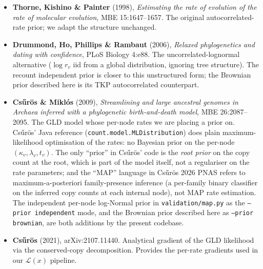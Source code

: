 \documentclass[11pt]{article}
\newcommand{\rate}{\kappa}             %
\newcommand{\dup}{\lambda}             %
\newcommand{\edgelen}{t}               %
\newcommand{\Ll}{\mathcal{L}}          %
\theoremstyle{definition}
\begin{document}
\begin{itemize}
\item \textbf{Thorne, Kishino \& Painter} (1998),
  \emph{Estimating the rate of evolution of the rate of molecular
  evolution}, MBE 15:1647--1657. The original autocorrelated-rate
  prior; we adapt the structure unchanged.
\item \textbf{Drummond, Ho, Phillips \& Rambaut} (2006),
  \emph{Relaxed phylogenetics and dating with confidence}, PLoS
  Biology 4:e88. The uncorrelated-lognormal alternative
  ($\log r_v$ iid from a global distribution, ignoring tree
  structure). The recount independent prior is closer to this
  unstructured form; the Brownian prior described here is its TKP
  autocorrelated counterpart.
\item \textbf{Cs\H{u}r\"os \& Mikl\'os} (2009), \emph{Streamlining and
  large ancestral genomes in Archaea inferred with a phylogenetic
  birth-and-death model}, MBE 26:2087--2095. The GLD model whose
  per-node rates we are placing a prior on. Cs\H{u}r\"os' Java
  reference (\texttt{count.model.MLDistribution}) does
  plain maximum-likelihood optimisation of the rates: no Bayesian
  prior on the per-node $(\rate_v,\dup_v,\edgelen_v)$. The only
  ``prior'' in Cs\H{u}r\"os' code is the \emph{root prior} on the
  copy count at the root, which is part of the model itself, not a
  regulariser on the rate parameters; and the ``MAP'' language in
  Cs\H{u}r\"os 2026 PNAS refers to maximum-a-posteriori
  family-presence inference (a per-family binary classifier on the
  inferred copy counts at each internal node), not MAP rate
  estimation. The independent per-node log-Normal prior in
  \texttt{validation/map.py} as the \texttt{--prior independent}
  mode, and the Brownian prior described here as
  \texttt{--prior brownian}, are both additions by the present
  codebase.
\item \textbf{Cs\H{u}r\"os} (2021), arXiv:2107.11440. Analytical
  gradient of the GLD likelihood via the conserved-copy
  decomposition. Provides the per-rate gradients used in our
  $\Ll(x)$ pipeline.
\end{itemize}
\end{document}
